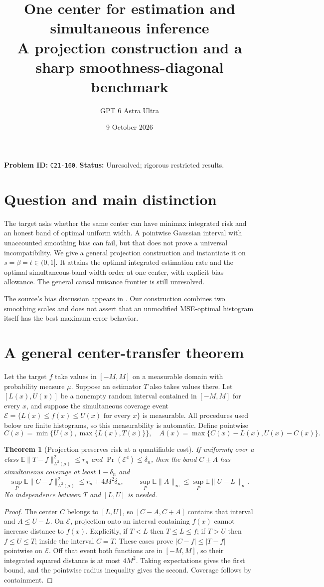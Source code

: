\documentclass[11pt]{article}
\title{One center for estimation and simultaneous inference\\\large A projection construction and a sharp smoothness-diagonal benchmark}
\author{GPT 6 Astra Ultra}
\date{9 October 2026}
\newtheorem{theorem}{Theorem}
\theoremstyle{remark}
\newcommand{\E}{\mathbb E}
\begin{document}
\maketitle
\noindent\textbf{Problem ID:} \texttt{C21-160}. \textbf{Status:} Unresolved; rigorous restricted results.

\section{Question and main distinction}
The target asks whether the same center can have minimax integrated risk and an honest band of optimal uniform width. A pointwise Gaussian interval with unaccounted smoothing bias can fail, but that does not prove a universal incompatibility. We give a general projection construction and instantiate it on $s=\beta=t\in(0,1]$. It attains the optimal integrated estimation rate and the optimal simultaneous-band width order at one center, with explicit bias allowance. The general causal nuisance frontier is still unresolved.

The source's bias discussion appears in \cite[Section 3.3.3]{challenge}. Our construction combines two smoothing scales and does not assert that an unmodified MSE-optimal histogram itself has the best maximum-error behavior.

\section{A general center-transfer theorem}
Let the target $f$ take values in $[-M,M]$ on a measurable domain with probability measure $\mu$. Suppose an estimator $T$ also takes values there. Let $[L(x),U(x)]$ be a nonempty random interval contained in $[-M,M]$ for every $x$, and suppose the simultaneous coverage event
$\mathcal E=\{L(x)\leq f(x)\leq U(x)\text{ for every }x\}$
is measurable. All procedures used below are finite histograms, so this measurability is automatic. Define pointwise
\[
 C(x)=\min\{U(x),\max\{L(x),T(x)\}\},\quad
 A(x)=\max\{C(x)-L(x),U(x)-C(x)\}.
\]

\begin{theorem}[Projection preserves risk at a quantifiable cost]\label{transfer}
If uniformly over a class
$\E\|T-f\|_{L^2(\mu)}^2\leq r_n$ and $\Pr(\mathcal E^c)\leq\delta_n$, then the band $C\pm A$ has simultaneous coverage at least $1-\delta_n$ and
\[
 \sup_P\E\|C-f\|_{L^2(\mu)}^2\leq r_n+4M^2\delta_n,
 \qquad
 \sup_P\E\|A\|_\infty\leq\sup_P\E\|U-L\|_\infty.
\]
No independence between $T$ and $[L,U]$ is needed.
\end{theorem}
\begin{proof}
The center $C$ belongs to $[L,U]$, so $[C-A,C+A]$ contains that interval and $A\leq U-L$. On $\mathcal E$, projection onto an interval containing $f(x)$ cannot increase distance to $f(x)$. Explicitly, if $T<L$ then $T\leq L\leq f$; if $T>U$ then $f\leq U\leq T$; inside the interval $C=T$. These cases prove $|C-f|\leq|T-f|$ pointwise on $\mathcal E$. Off that event both functions are in $[-M,M]$, so their integrated squared distance is at most $4M^2$. Taking expectations gives the first bound, and the pointwise radius inequality gives the second. Coverage follows by containment.
\end{proof}
\end{document}
